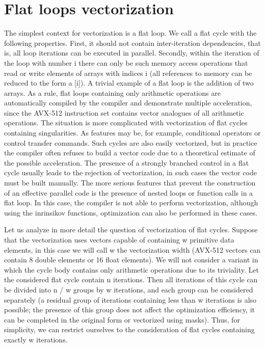 \documentclass[
11pt,%
tightenlines,%
twoside,%
onecolumn,%
nofloats,%
nobibnotes,%
nofootinbib,%
superscriptaddress,%
noshowpacs,%
centertags]%
{revtex4}
\begin{document}
\section{Flat loops vectorization}

The simplest context for vectorization is a flat loop. We call a flat cycle with the following properties. First, it should not contain inter-iteration dependencies, that is, all loop iterations can be executed in parallel. Secondly, within the iteration of the loop with number i there can only be such memory access operations that read or write elements of arrays with indices i (all references to memory can be reduced to the form a [i]). A trivial example of a flat loop is the addition of two arrays. As a rule, flat loops containing only arithmetic operations are automatically compiled by the compiler and demonstrate multiple acceleration, since the AVX-512 instruction set contains vector analogues of all arithmetic operations. The situation is more complicated with vectorization of flat cycles containing singularities. As features may be, for example, conditional operators or control transfer commands. Such cycles are also easily vectorized, but in practice the compiler often refuses to build a vector code due to a theoretical estimate of the possible acceleration. The presence of a strongly branched control in a flat cycle usually leads to the rejection of vectorization, in such cases the vector code must be built manually. The more serious features that prevent the construction of an effective parallel code is the presence of nested loops or function calls in a flat loop. In this case, the compiler is not able to perform vectorization, although using the inrinsikov functions, optimization can also be performed in these cases.

Let us analyze in more detail the question of vectorization of flat cycles. Suppose that the vectorization uses vectors capable of containing w primitive data elements, in this case we will call w the vectorization width (AVX-512 vectors can contain 8 double elements or 16 float elements). We will not consider a variant in which the cycle body contains only arithmetic operations due to its triviality. Let the considered flat cycle contain n iterations. Then all iterations of this cycle can be divided into n / w groups by w iterations, and each group can be considered separately (a residual group of iterations containing less than w iterations is also possible; the presence of this group does not affect the optimization efficiency, it can be completed in the original form or vectorized using masks). Thus, for simplicity, we can restrict ourselves to the consideration of flat cycles containing exactly w iterations.
\end{document}
